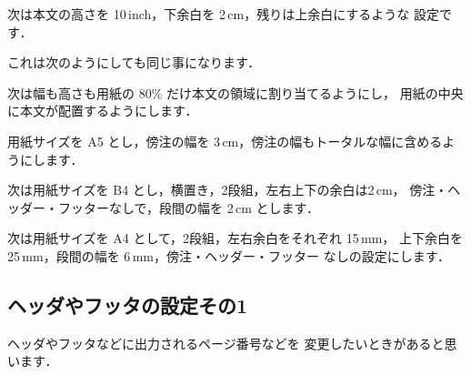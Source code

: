 
次は本文の高さを 10\,inch，下余白を 2\,cm，残りは上余白にするような
設定です．


これは次のようにしても同じ事になります．

\begin{InTeX}
\geometry{bottom=2cm,textheight=10in}
\end{InTeX}


次は幅も高さも用紙の 80\% だけ本文の領域に割り当てるようにし，
用紙の中央に本文が配置するようにします．


用紙サイズを A5 とし，傍注の幅を 3\,cm，傍注の幅もトータルな幅に含めるよ
うにします．


次は用紙サイズを B4 とし，横置き，2段組，左右上下の余白は2\,cm，
傍注・ヘッダー・フッターなしで，段間の幅を 2\,cm とします．



次は用紙サイズを A4 として，2段組，左右余白をそれぞれ 15\,mm，
上下余白を 25\,mm，段間の幅を 6\,mm，傍注・ヘッダー・フッター
なしの設定にします．





\subsection{ヘッダやフッタの設定その1}%
ヘッダやフッタなどに出力されるページ番号などを
変更したいときがあると思います．
\begin{Syntax}
\end{Syntax}

